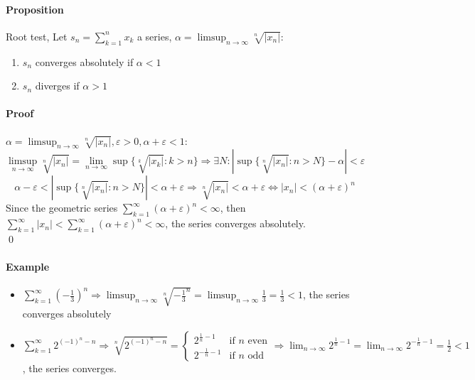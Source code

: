 \documentclass{article}
\newcommand{\DS}{\displaystyle}
\newcommand{\abs}[1]{\left|#1\right|}
\newcommand{\limn}{\lim_{n \to \infty}}
\newcommand{\limsupn}{\limsup_{n \to \infty}}
\newcommand{\sumn}[1]{\sum_{k=1}^n #1}
\newcommand{\series}[1]{\sum_{k=1}^\infty #1}
\newcommand{\Ep}{\varepsilon}
\newcommand{\Proposition}{\paragraph{Proposition}}
\newcommand{\Proof}{\paragraph{Proof}}
\newcommand{\Example}{\paragraph{Example}}
\begin{document}
  \Proposition Root test, Let $\DS s_n = \sumn{x_k}$ a series, $\DS \alpha =
  \limsupn \sqrt[n]{\abs{x_n}}$:
  \begin{enumerate}[label=(\roman*)]
    \item $s_n$ converges absolutely if $\alpha < 1$
    \item $s_n$ diverges if $\alpha > 1$
  \end{enumerate}

  \Proof $\alpha = \limsupn \sqrt[n]{\abs{x_n}}, \Ep > 0, \alpha + \Ep
  < 1$:
  \begin{equation*}
    \limsupn \sqrt[n]{\abs{x_n}} = \limn \sup\{\sqrt[k]{\abs{x_k}} : k > n\}
    \Rightarrow \exists N : \abs{\sup\{\sqrt[n]{\abs{x_n}} : n > N\} - \alpha} <
    \Ep
  \end{equation*}
  \begin{equation*}
    \alpha - \Ep < \abs{\sup\{\sqrt[n]{\abs{x_n}} : n > N\}} < \alpha + \Ep
    \Rightarrow \sqrt[n]{\abs{x_n}} < \alpha + \Ep \iff
    \abs{x_n} < (\alpha + \Ep)^n
  \end{equation*}
  Since the geometric series $\DS \series (\alpha + \Ep)^n < \infty$, then
  $\DS \series \abs{x_n} < \series (\alpha + \Ep)^n < \infty$, the series
  converges absolutely.
\\\qed

  \Example
  \begin{itemize}
    \item $\DS \series\left({-\frac{1}{3}}\right)^n \Rightarrow
    \limsupn \sqrt[n]{-\frac{1}{3}^n} = \limsupn \frac{1}{3} = \frac{1}{3} < 1$,
    the series converges absolutely
    \item $\DS \series 2^{(-1)^n-n} \Rightarrow \sqrt[n]{2^{(-1)^n-n}} =
    \begin{cases}
      2^{\frac{1}{n}-1}  & \text{if } n \text{ even} \\
      2^{-\frac{1}{n}-1} & \text{if } n \text{ odd}
    \end{cases} \Rightarrow
    \limn 2^{\frac{1}{n}-1} = \limn 2^{-\frac{1}{n}-1} = \frac{1}{2} < 1$,
    the series converges.
  \end{itemize}

\newpage %
\end{document}
